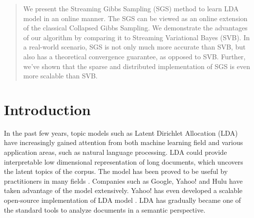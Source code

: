 \documentclass{article}
\begin{document}
 


\begin{abstract} 
We present the Streaming Gibbs Sampling (SGS) method to learn LDA model in an online manner.
The SGS can be viewed as an online extension of the classical Collapsed Gibbs Sampling.
We demonstrate the advantages of our algorithm by comparing it to Streaming Variational Bayes (SVB).
In a real-world scenario, SGS is not only much more accurate than SVB, but also has a theoretical convergence 
guarantee, as opposed to SVB. Further, we've shown that the sparse and distributed implementation of SGS is even more scalable than SVB. 
\end{abstract} 

\section{Introduction}
\label{intro}
In the past few years, topic models such as Latent Dirichlet Allocation (LDA) have increasingly gained attention
from both machine learning field and various application areas, such as natural language processing. LDA could provide interpretable low dimensional representation of long documents, which uncovers the latent topics of the corpus. The model has been proved to be useful by practitioners in many fields \cite{mitchell2008vector, naveed2011bad}. Companies such as Google, Yahoo! and Hulu have taken advantage of the model extensively. Yahoo! has even developed a scalable open-source implementation of LDA model \cite{ahmed2012scalable}. LDA has gradually became one of the standard tools to analyze documents in a semantic perspective.
\end{document}
